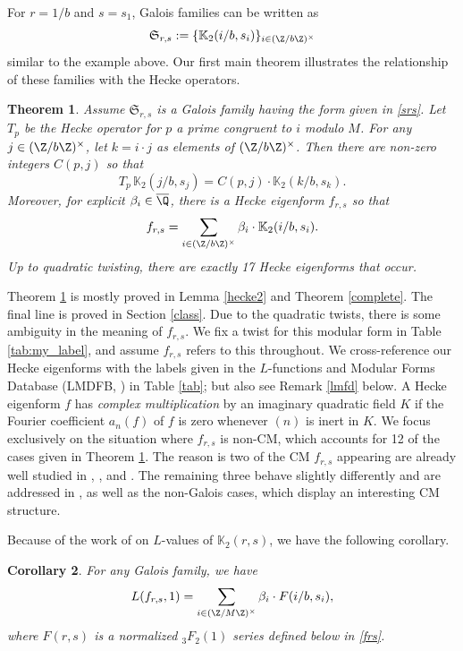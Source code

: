 \documentclass[12pt]{amsart}
\renewcommand{\bar}{\overline}
\newtheorem{theorem}{Theorem}[section]
\newtheorem{corollary}[theorem]{Corollary}
\theoremstyle{definition}
\theoremstyle{remark}
\begin{document}
For $r=1/b$ and $s=s_1$, Galois families can be written as
\begin{equation}\label{srs}
    \mathfrak{S}_{r,s}:=\{\mathbb{K}_2(i/b,s_i)\}_{i\in (\Z/b\Z)^\times}
\end{equation} similar to the example above. 
 Our first main theorem illustrates the relationship of these families with the Hecke operators.
\begin{theorem}\label{completepre}
   Assume $\mathfrak{S}_{r,s}$ is a Galois family having the form given in \eqref{srs}. Let $T_p$ be the Hecke operator for $p$ a prime congruent to $i$ modulo $M$. For any $j\in (\Z/b\Z)^\times$, let $k=i\cdot j$ as elements of $(\Z/b\Z)^\times$. Then there are non-zero integers $C(p,j)$ so that $$T_p\, \mathbb{K}_2(j/b,s_j)=C(p,j)\cdot \mathbb{K}_2(k/b,s_k).$$ Moreover, for explicit $\beta_i\in \bar{\Q}$, there is a Hecke eigenform $f_{r,s}$ so that $$f_{r,s}=\sum_{i\in (\Z/b\Z)^\times}\beta_i\cdot \mathbb{K}_2(i/b,s_i).$$ Up to quadratic twisting, there are exactly 17 Hecke eigenforms that occur.
\end{theorem}
Theorem \ref{completepre} is mostly proved in Lemma \ref{hecke2} and Theorem \ref{complete}. The final line is proved in Section \ref{class}. Due to the quadratic twists, there is some ambiguity in the meaning of $f_{r,s}$. We fix a twist for this modular form in Table \ref{tab:my_label}, and assume $f_{r,s}$ refers to this throughout. We cross-reference our Hecke eigenforms with the labels given in the $L$-functions and Modular Forms Database (LMDFB, \cite{lmfdb}) in Table \ref{tab}; but also see Remark \ref{lmfd} below. A Hecke eigenform $f$ has \textit{complex multiplication} by an imaginary quadratic field $K$ if the Fourier coefficient $a_n(f)$ of $f$ is zero whenever $(n)$ is inert in $K$.  We focus exclusively on the situation where $f_{r,s}$ is non-CM, which accounts for 12 of the cases given in Theorem \ref{completepre}. The reason is two of the CM $f_{r,s}$ appearing are already well studied in \cite{ahlgrenono},
\cite{aglt}, and \cite{osburnstraub}. The remaining three behave slightly differently and are addressed in \cite{rosen2}, as well as the non-Galois cases, which display an interesting  CM structure. 
 
Because of the work of \cite{aglt} on $L$-values of $\mathbb{K}_2(r,s)$, we have the following corollary.
\begin{corollary}\label{lvalue}
    For any Galois family, we have $$L(f_{r,s},1)=\sum_{i\in (\Z/M\Z)^\times}\beta_i\cdot F(i/b,s_i),$$ where $F(r,s)$ is a normalized 
    ${}_3F_2(1)$ series defined below  in \eqref{frs}.
\end{corollary}
\end{document}
